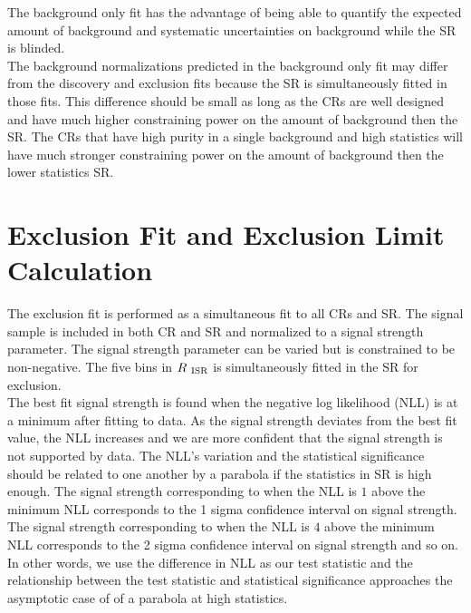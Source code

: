 \indent The background only fit has the advantage of being able to quantify the expected amount of background and systematic uncertainties on background while the SR is blinded.  \\

\indent The background normalizations predicted in the background only fit may differ from the discovery and exclusion fits because the SR is simultaneously fitted in those fits. This difference should be small as long as the CRs are well designed and have much higher constraining power on the amount of background then the SR.  The CRs that have high purity in a single background and high statistics will have much stronger constraining power on the amount of background then the lower statistics SR.  \\

\section{Exclusion Fit and Exclusion Limit Calculation}
\label{sec:stat:limit}

\indent The exclusion fit is performed as a simultaneous fit to all CRs and SR.  The signal sample is included in both CR and SR and normalized to a signal strength parameter.  The signal strength parameter can be varied but is constrained to be non-negative.  The five bins in $R_{~\mathrm{ISR}}$ is simultaneously fitted in the SR for exclusion.  \\

\indent The best fit signal strength is found when the negative log likelihood (NLL) is at a minimum after fitting to data.  As the signal strength deviates from the best fit value, the NLL increases and we are more confident that the signal strength is not supported by data.  The NLL's variation and the statistical significance should be related to one another by a parabola if the statistics in SR is high enough.  The signal strength corresponding to when the NLL is $1$ above the minimum NLL corresponds to the 1 sigma confidence interval on signal strength.  The signal strength corresponding to when the NLL is $4$ above the minimum NLL corresponds to the 2 sigma confidence interval on signal strength and so on. \\

\indent In other words, we use the difference in NLL as our test statistic and the relationship between the test statistic and statistical significance approaches the asymptotic case of of a parabola at high statistics. \\

